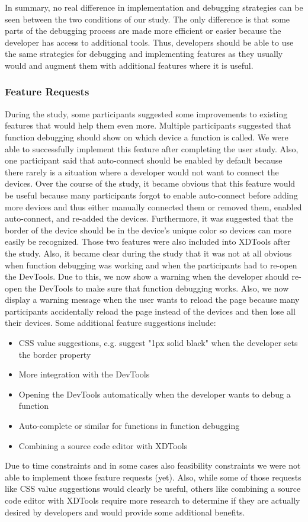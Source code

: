 In summary, no real difference in implementation and debugging strategies can be seen between the two conditions of our study. The only difference is that some parts of the debugging process are made more efficient or easier because the developer has access to additional tools. Thus, developers should be able to use the same strategies for debugging and implementing features as they usually would and augment them with additional features where it is useful. 

\subsubsection{Feature Requests}

During the study, some participants suggested some improvements to existing features that would help them even more. Multiple participants suggested that function debugging should show on which device a function is called. We were able to successfully implement this feature after completing the user study. Also, one participant said that auto-connect should be enabled by default because there rarely is a situation where a developer would not want to connect the devices. Over the course of the study, it became obvious that this feature would be useful because many participants forgot to enable auto-connect before adding more devices and thus either manually connected them or removed them, enabled auto-connect, and re-added the devices. Furthermore, it was suggested that the border of the device should be in the device's unique color so devices can more easily be recognized. Those two features were also included into XDTools after the study. Also, it became clear during the study that it was not at all obvious when function debugging was working and when the participants had to re-open the DevTools. Due to this, we now show a warning when the developer should re-open the DevTools to make sure that function debugging works. Also, we now display a warning message when the user wants to reload the page because many participants accidentally reload the page instead of the devices and then lose all their devices. Some additional feature suggestions include:
\begin{itemize}
	\item CSS value suggestions, e.g. suggest "1px solid black" when the developer sets the border property
	\item More integration with the DevTools
	\item Opening the DevTools automatically when the developer wants to debug a function
	\item Auto-complete or similar for functions in function debugging
	\item Combining a source code editor with XDTools
\end{itemize}
Due to time constraints and in some cases also feasibility constraints we were not able to implement those feature requests (yet). Also, while some of those requests like CSS value suggestions would clearly be useful, others like combining a source code editor with XDTools require more research to determine if they are actually desired by developers and would provide some additional benefits.